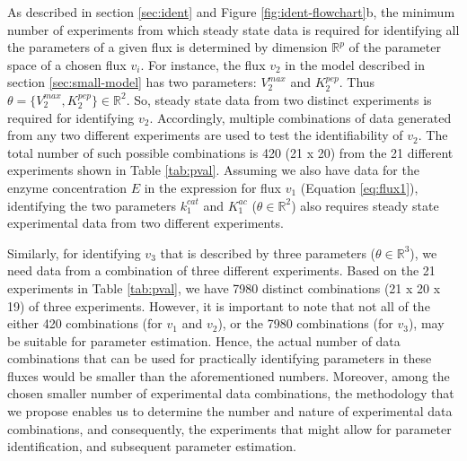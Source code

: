 \documentclass[10pt]{article}
\begin{document}
As described in section \ref{sec:ident} and Figure \ref{fig:ident-flowchart}b, the minimum number of experiments from which steady state data is required for identifying all the parameters of a given flux is determined by dimension $\mathbb{R}^p$ of the parameter space of a chosen flux $v_i$. For instance, the flux $v_2$ in the model described in section \ref{sec:small-model} has two parameters: $V_2^{max}$ and $K_2^{pep}$. Thus $\theta = \{V_2^{max}, K_2^{pep}\} \in \mathbb{R}^2$. So, steady state data from two distinct experiments is required for identifying $v_2$. Accordingly, multiple combinations of data generated from any two different experiments are used to test the identifiability of $v_2$. The total number of such possible combinations is 420 (21 x 20) from the 21 different experiments shown in Table \ref{tab:pval}. Assuming we also have data for the enzyme concentration $E$ in the expression for flux $v_1$ (Equation \ref{eq:flux1}), identifying the two parameters $k_1^{cat}$ and $K_1^{ac}$ ($\theta \in \mathbb{R}^2$) also requires steady state experimental data from two different experiments.

Similarly, for identifying $v_3$ that is described by three parameters ($\theta \in \mathbb{R}^3$), we need data from a combination of three different experiments. Based on the 21 experiments in Table \ref{tab:pval}, we have 7980 distinct combinations (21 x 20 x 19) of three experiments. However, it is important to note that not all of the either 420 combinations (for $v_1$ and $v_2$), or the 7980 combinations (for $v_3$), may be suitable for parameter estimation. Hence, the actual number of data combinations that can be used for practically identifying parameters in these fluxes would be smaller than the aforementioned numbers. Moreover, among the chosen smaller number of experimental data combinations, the methodology that we propose enables us to determine the number and nature of experimental data combinations, and consequently, the experiments that might allow for parameter identification, and subsequent parameter estimation.

\printbibliography
\end{document}
